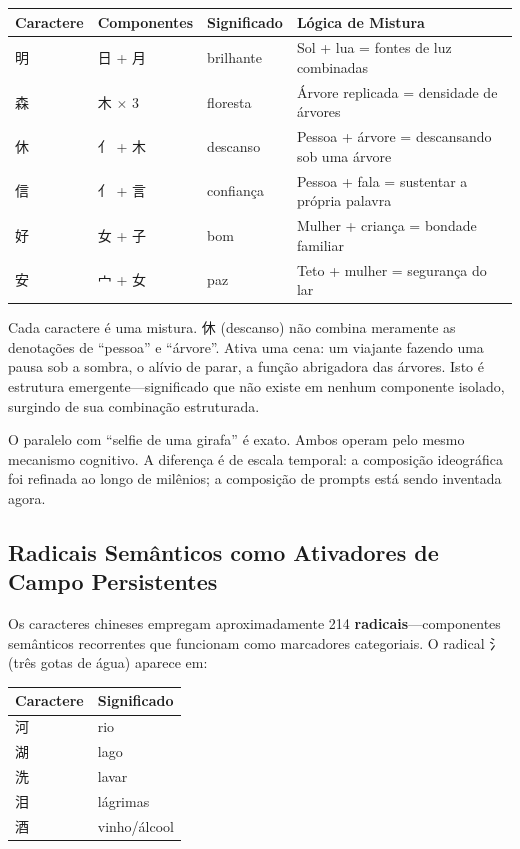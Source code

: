 \documentclass[12pt,a4paper]{article}
\newcommand{\cjk}[1]{{\cjkfont #1}}
\begin{document}
\begin{center}
\begin{tabular}{lllp{7cm}}
\toprule
\textbf{Caractere} & \textbf{Componentes} & \textbf{Significado} & \textbf{Lógica de Mistura} \\
\midrule
\cjk{明} & \cjk{日} + \cjk{月} & brilhante & Sol + lua = fontes de luz combinadas \\
\cjk{森} & \cjk{木} $\times$ 3 & floresta & Árvore replicada = densidade de árvores \\
\cjk{休} & \cjk{亻} + \cjk{木} & descanso & Pessoa + árvore = descansando sob uma árvore \\
\cjk{信} & \cjk{亻} + \cjk{言} & confiança & Pessoa + fala = sustentar a própria palavra \\
\cjk{好} & \cjk{女} + \cjk{子} & bom & Mulher + criança = bondade familiar \\
\cjk{安} & \cjk{宀} + \cjk{女} & paz & Teto + mulher = segurança do lar \\
\bottomrule
\end{tabular}
\end{center}

Cada caractere é uma mistura.
\cjk{休} (descanso) não combina meramente as denotações de ``pessoa'' e ``árvore''.
Ativa uma cena: um viajante fazendo uma pausa sob a sombra, o alívio de parar, a função abrigadora das árvores.
Isto é estrutura emergente---significado que não existe em nenhum componente isolado, surgindo de sua combinação estruturada.

O paralelo com ``selfie de uma girafa'' é exato.
Ambos operam pelo mesmo mecanismo cognitivo.
A diferença é de escala temporal: a composição ideográfica foi refinada ao longo de milênios; a composição de prompts está sendo inventada agora.

\subsection{Radicais Semânticos como Ativadores de Campo Persistentes}
\label{subsec:radicals}

Os caracteres chineses empregam aproximadamente 214 \textbf{radicais}---componentes semânticos recorrentes que funcionam como marcadores categoriais.
O radical \cjk{氵} (três gotas de água) aparece em:

\begin{center}
\begin{tabular}{ll}
\toprule
\textbf{Caractere} & \textbf{Significado} \\
\midrule
\cjk{河} & rio \\
\cjk{湖} & lago \\
\cjk{洗} & lavar \\
\cjk{泪} & lágrimas \\
\cjk{酒} & vinho/álcool \\
\bottomrule
\end{tabular}
\end{center}
\end{document}
